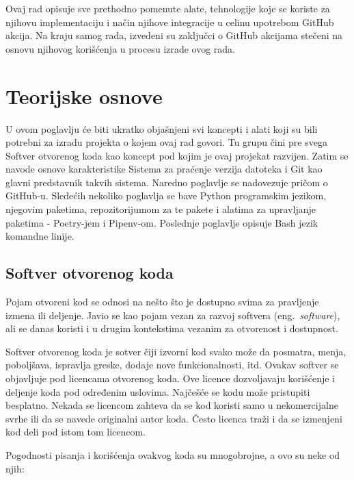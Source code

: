 \documentclass[12pt]{report}
\begin{document}
Ovaj rad opisuje sve prethodno pomenute alate, tehnologije koje se koriste za njihovu implementaciju i način njihove integracije u celinu upotrebom GitHub akcija. Na kraju samog rada, izvedeni su zaključci o GitHub akcijama stečeni na osnovu njihovog korišćenja u procesu izrade ovog rada.

\chapter{Teorijske osnove}
U ovom poglavlju će biti ukratko objašnjeni svi koncepti i alati koji su bili potrebni za izradu projekta o kojem ovaj rad govori. Tu grupu čini pre svega Softver otvorenog koda kao koncept pod kojim je ovaj projekat razvijen. Zatim se navode osnove karakteristike Sistema za praćenje verzija datoteka i Git kao glavni predstavnik takvih sistema. Naredno poglavlje se nadovezuje pričom o GitHub-u. Sledećih nekoliko poglavlja se bave Python programskim jezikom, njegovim paketima, repozitorijumom za te pakete i alatima za upravljanje paketima - Poetry-jem i Pipenv-om. Poslednje poglavlje opisuje Bash jezik komandne linije.

\section{Softver otvorenog koda}
Pojam otvoreni kod se odnosi na nešto što je dostupno svima za pravljenje izmena ili deljenje. Javio se kao pojam vezan za razvoj softvera (eng.\ \textit{software}), ali se danas koristi i u drugim kontekstima vezanim za otvorenost i dostupnost.

Softver otvorenog koda je sotver čiji izvorni kod svako može da posmatra, menja, poboljšava, ispravlja greske, dodaje nove funkcionalnosti, itd. Ovakav softver se objavljuje pod licencama otvorenog koda. Ove licence dozvoljavaju korišćenje i deljenje koda pod određenim uslovima. Najčešće se kodu može pristupiti besplatno. Nekada se licencom zahteva da se kod koristi samo u nekomercijalne svrhe ili da se navede originalni autor koda. Često licenca traži i da se izmenjeni kod deli pod istom tom licencom.

Pogodnosti pisanja i korišćenja ovakvog koda su mnogobrojne, a ovo su neke od njih:
\end{document}
